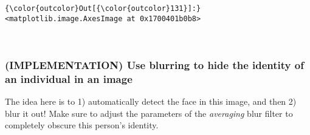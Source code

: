 \documentclass[11pt]{article}
\begin{document}
\begin{Verbatim}[commandchars=\\\{\}]
{\color{outcolor}Out[{\color{outcolor}131}]:} <matplotlib.image.AxesImage at 0x1700401b0b8>
\end{Verbatim}
            
    \begin{center}
    \end{center}
    { \hspace*{\fill} \\}
    
    \subsubsection{(IMPLEMENTATION) Use blurring to hide the identity of an
individual in an
image}\label{implementation-use-blurring-to-hide-the-identity-of-an-individual-in-an-image}

The idea here is to 1) automatically detect the face in this image, and
then 2) blur it out! Make sure to adjust the parameters of the
\emph{averaging} blur filter to completely obscure this person's
identity.
\end{document}
